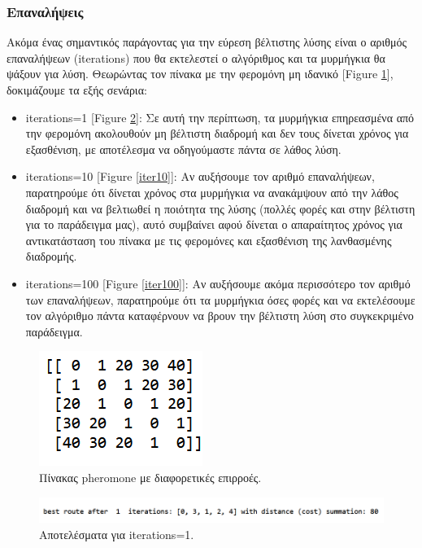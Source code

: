 \subsubsection{Επαναλήψεις}
Ακόμα ένας σημαντικός παράγοντας για την εύρεση βέλτιστης λύσης είναι ο αριθμός επαναλήψεων (iterations) που θα εκτελεστεί ο αλγόριθμος και τα μυρμήγκια θα ψάξουν για λύση. Θεωρώντας τον πίνακα με την φερομόνη μη ιδανικό [Figure \ref{pher2}], δοκιμάζουμε τα εξής σενάρια:
\begin{itemize}
    \item iterations=1 [Figure \ref{iter1}]:
    Σε αυτή την περίπτωση, τα μυρμήγκια επηρεασμένα από την φερομόνη ακολουθούν μη βέλτιστη διαδρομή και δεν τους δίνεται χρόνος για εξασθένιση, με αποτέλεσμα να οδηγούμαστε πάντα σε λάθος λύση.
    \item iterations=10 [Figure \ref{iter10}]:
    Αν αυξήσουμε τον αριθμό επαναλήψεων, παρατηρούμε ότι δίνεται χρόνος στα μυρμήγκια να ανακάμψουν από την λάθος διαδρομή και να βελτιωθεί η ποιότητα της λύσης (πολλές φορές και στην βέλτιστη για το παράδειγμα μας), αυτό συμβαίνει αφού δίνεται ο απαραίτητος χρόνος για αντικατάσταση του πίνακα με τις φερομόνες και εξασθένιση της λανθασμένης διαδρομής.
    \item iterations=100 [Figure \ref{iter100}]:
    Αν αυξήσουμε ακόμα περισσότερο τον αριθμό των επαναλήψεων, παρατηρούμε ότι τα μυρμήγκια όσες φορές και να εκτελέσουμε τον αλγόριθμο πάντα καταφέρνουν να βρουν την βέλτιστη λύση στο συγκεκριμένο παράδειγμα.
\end{itemize}
\begin{figure}
    \centering
    \includegraphics[scale=1]{2947_thesis/pictures/pheromone2.png} 
    \caption{Πίνακας pheromone με διαφορετικές επιρροές.}
    \label{pher2}
\end{figure}
\begin{figure}
    \centering
    \includegraphics[scale=0.60]{2947_thesis/pictures/ex4.png} 
    \caption{Αποτελέσματα για iterations=1.}
    \label{iter1}
\end{figure}
